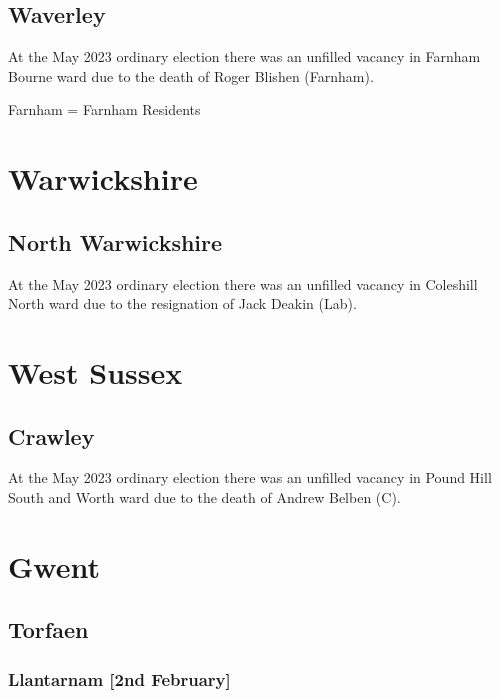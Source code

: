 \documentclass[a4paper,openany]{book}
\begin{document}
\begin{resultsiii}
\subsection*{Waverley}

At the May 2023 ordinary election there was an unfilled vacancy in Farnham Bourne ward due to the death of Roger Blishen (Farnham).%

Farnham = Farnham Residents

\section{Warwickshire}

\subsection*{North Warwickshire}

At the May 2023 ordinary election there was an unfilled vacancy in Coleshill North ward due to the resignation of Jack Deakin (Lab).%

\section{West Sussex}

\subsection*{Crawley}

At the May 2023 ordinary election there was an unfilled vacancy in Pound Hill South and Worth ward due to the death of Andrew Belben (C).%

\section{Gwent}

\subsection*{Torfaen}

\subsubsection*{Llantarnam \hspace*{\fill}\nolinebreak[1]%
	\enspace\hspace*{\fill}
	[2nd February]}


\end{resultsiii}
\end{document}
